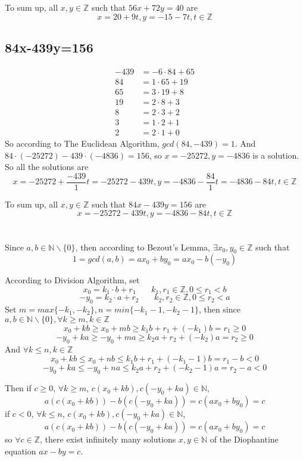 \documentclass[a4paper,12pt,titlepage]{article}
\begin{document}
To sum up, all $x,y\in\mathbb{Z} $ such that $56x+72y=40$ are
$$x=20+9t,y=-15-7t,t\in\mathbb{Z}$$

\subsection{84x-439y=156}
\begin{align*}
-439&=-6\cdot84+65\\
84&=1\cdot65+19\\
65&=3\cdot19+8\\
19&=2\cdot 8+3\\
8&=2\cdot 3+2\\
3&=1\cdot 2+1\\
2&=2\cdot 1+0
\end{align*}
So according to The Euclidean Algorithm,  $gcd(84,-439)=1$. And $84\cdot(-25272)-439\cdot(-4836)=156$, so $x=-25272,y=-4836$ is a solution. So all the solutions are
$$x=-25272+\dfrac{-439}{1}t=-25272-439t,y=-4836-\dfrac{84}{1}t=-4836-84t,t\in\mathbb{Z}$$

To sum up, all $x,y\in\mathbb{Z} $ such that $84x-439y=156$ are
$$x=-25272-439t,y=-4836-84t,t\in\mathbb{Z}$$
\section{}
\subsection{}
Since $a,b\in \mathbb{N}\backslash\lbrace0\rbrace$, then according to Bezout's Lemma, $\exists x_0,y_0\in\mathbb{Z}$ such that
$$1=gcd(a,b)=ax_0+by_0=ax_0-b(-y_0)$$

According to Division Algorithm, set
$$x_0=k_1\cdot b+r_1\,\,\,\,\,\,\,\,\,\,\,k_1,r_1\in\mathbb{Z},0\leqslant r_1<b$$
$$-y_0=k_2\cdot a+r_2\,\,\,\,\,\,\,\,\,\,\,k_2,r_2\in\mathbb{Z},0\leqslant r_2<a$$
Set $m=max\lbrace-k_1,-k_2\rbrace,n=min\lbrace-k_1-1,-k_2-1\rbrace$, then since $a,b\in \mathbb{N}\backslash\lbrace0\rbrace,\forall k\geqslant m,k\in\mathbb{Z}$
$$x_0+kb\geqslant x_0+mb\geqslant k_1b+r_1+(-k_1)b=r_1\geqslant0$$
$$-y_0+ka\geqslant-y_0+ma\geqslant k_2a+r_2+(-k_2)a=r_2\geqslant0$$
And $\forall k\leqslant n,k\in\mathbb{Z}$
$$x_0+kb\leqslant x_0+nb\leqslant k_1b+r_1+(-k_1-1)b=r_1-b<0$$
$$-y_0+ka\leqslant-y_0+na\leqslant k_2a+r_2+(-k_2-1)a=r_2-a<0$$

Then if $c\geqslant0$, $\forall k\geqslant m$, $c(x_0+kb),c(-y_0+ka)\in\mathbb{N}$,
$$a(c(x_0+kb))-b(c(-y_0+ka))=c(ax_0+by_0)=c$$
if $c<0$, $\forall k\leqslant n$, $c(x_0+kb),c(-y_0+ka)\in\mathbb{N}$,
$$a(c(x_0+kb))-b(c(-y_0+ka))=c(ax_0+by_0)=c$$
so $\forall c\in\mathbb{Z}$, there exist infinitely many solutions $x,y\in\mathbb{N}$ of the Diophantine equation $ax-by=c$.
\end{document}
